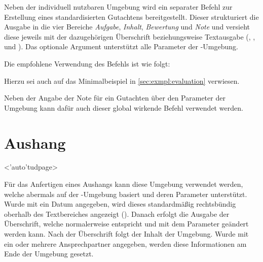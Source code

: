 \begin{DeclareEntity}{}
\begin{Declaration}
Neben der individuell nutzbaren Umgebung  wird ein 
separater Befehl zur Erstellung eines standardisierten Gutachtens 
bereitgestellt. Dieser strukturiert die Ausgabe in die vier Bereiche 
\emph{Aufgabe}, \emph{Inhalt}, \emph{Bewertung} und \emph{Note} und versieht 
diese jeweils mit der dazugehörigen Überschrift beziehungsweise Textausgabe 
(, ,  und 
). Das optionale Argument unterstützt alle Parameter der 
-Umgebung.
\end{Declaration}
%
\begin{Example}
Die empfohlene Verwendung des Befehls  ist wie folgt:
\begin{Code}
\end{Code}
Hierzu sei auch auf das Minimalbeispiel in \autoref{sec:exmpl:evaluation} 
verwiesen.%
\end{Example}

\begin{Declaration}
  {}
\printdeclarationlist

Neben der Angabe der Note für ein Gutachten über den Parameter 
 der Umgebung  kann dafür 
auch dieser global wirkende Befehl verwendet werden.
\end{Declaration}
%



\section{%
  Aushang%
}

\begin{Declaration}
  {}
  <\Environment'auto'{tudpage}>
\begin{Declaration}
  {}
\printdeclarationlist

Für das Anfertigen eines Aushangs kann diese Umgebung verwendet werden, welche
abermals auf der -Umgebung basiert und deren Parameter 
unterstützt. Wurde mit  ein Datum angegeben, wird dieses 
standardmäßig rechtsbündig oberhalb des Textbereiches angezeigt 
(). Danach erfolgt die Ausgabe der 
Überschrift, welche normalerweise  entspricht und mit dem 
Parameter  geändert werden kann. Nach der 
Überschrift folgt der Inhalt der Umgebung. Wurde mit  ein 
oder mehrere Ansprechpartner angegeben, werden diese Informationen am Ende der 
Umgebung gesetzt.
\end{Declaration}
\end{Declaration}


\end{DeclareEntity}
